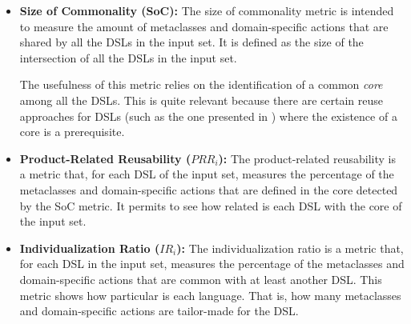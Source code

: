 \begin{itemize}
\item \textbf{Size of Commonality (SoC):} The size of commonality metric is intended to measure the amount of metaclasses and domain-specific actions that are shared by all the DSLs in the input set. It is defined as the size of the intersection of all the DSLs in the input set. 

\hspace{3mm} The usefulness of this metric relies on the identification of a common \textit{core} among all the DSLs. This is quite relevant because there are certain reuse approaches for DSLs (such as the one presented in \cite{Zschaler:2010b}) where the existence of a core is a prerequisite.


\vspace{1mm}
\item \textbf{Product-Related Reusability ($PRR_i$):} The product-related reusability is a metric that, for each DSL of the input set, measures the percentage of the metaclasses and domain-specific actions that are defined in the core detected by the SoC metric. It permits to see how related is each DSL with the core of the input set.


\vspace{2mm}
\item \textbf{Individualization Ratio ($IR_i$):} The individualization ratio is a metric that, for each DSL in the input set, measures the percentage of the metaclasses and domain-specific actions that are common with at least another DSL. This metric shows how particular is each language. That is, how many metaclasses and domain-specific actions are tailor-made for the DSL. 


\end{itemize}
